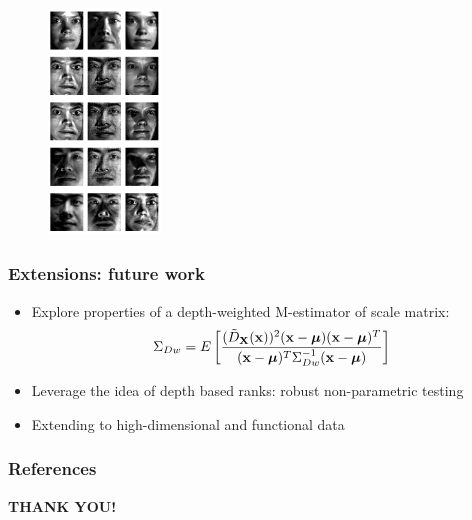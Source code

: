\documentclass[handout,10pt]{beamer}
\begin{document}
\begin{frame}
\begin{figure}[h]
		\includegraphics[width=3cm]{yaleB28recon.png}
	\label{fig:kdpca}
\end{figure}
\end{frame}

\begin{frame}
\frametitle{Extensions: future work}
\begin{itemize}
\item Explore properties of a depth-weighted M-estimator of scale matrix:
$$ \Sigma_{Dw} = E \left[ \frac{(\tilde D_{\mathbf{X}}({\bf{x}}))^2 ({\bf{x}} - {\boldsymbol{\mu}}) ({\bf{x}} - {\boldsymbol{\mu}})^T}{({\bf{x}} - {\boldsymbol{\mu}})^T \Sigma_{Dw}^{-1} ({\bf{x}} - {\boldsymbol{\mu}})} \right] $$
\vspace{.5cm}

\item Leverage the idea of depth based ranks: robust non-parametric testing

\item Extending to high-dimensional and functional data
\end{itemize}
\end{frame}

\begin{frame}
\frametitle{References}


\end{frame}


\begin{frame}
\centering\huge
\textcolor{UniBlue}{\textbf{THANK YOU!}}
\end{frame}
\end{document}
